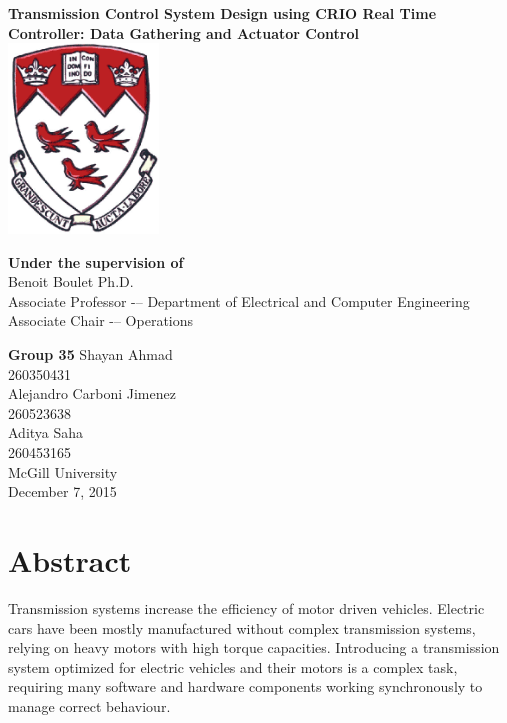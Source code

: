 \documentclass{article}
\begin{document}
\begin{titlepage}
    \centering
    \vfill
    {\bfseries\Large
        Transmission Control System Design using CRIO Real Time Controller: Data Gathering and Actuator Control\\
    }    
    \vskip2cm
    \includegraphics[width=4cm]{mcgill_logo.png}
    
    \vskip2cm
    \textbf{Under the supervision of}\\
	\vskip0.2cm
    Benoit Boulet Ph.D.\\
	Associate Professor -– Department of Electrical and Computer Engineering\\
	Associate Chair -– Operations

    \vskip1.3cm
    \textbf{Group 35}
    \vskip0.2cm
      Shayan Ahmad\\
      260350431\\
    \vskip0.4cm
      Alejandro Carboni Jimenez\\
      260523638\\
    \vskip0.4cm
      Aditya Saha\\
      260453165\\
    \vskip0.5cm
	McGill University\\
    December 7, 2015
    \vfill
\end{titlepage}

\section{Abstract}
\begin{flushleft}
	Transmission systems increase the efficiency of motor driven vehicles. Electric cars have been mostly manufactured without complex transmission systems, relying on heavy motors with high torque capacities. Introducing a transmission system optimized for electric vehicles and their motors is a complex task, requiring many software and hardware components working synchronously to manage correct behaviour.\end{flushleft}
\end{document}
